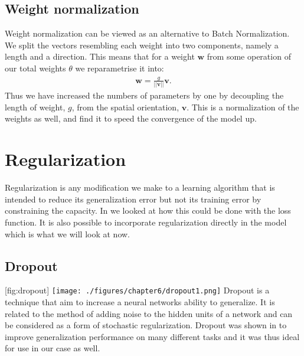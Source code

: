 \subsection{Weight normalization}
Weight normalization\cite{salimansWeightNormalizationSimple2016} can be viewed as an alternative to Batch Normalization. We split the vectors resembling each weight into two components, namely a length and a direction. This means that for a weight $\textbf{w}$ from some operation of our total weights $\theta$ we reparametrise it into:
\begin{align}
	\textbf{w} = \frac{g}{||\textbf{v}||} \textbf{v}.
\end{align}
Thus we have increased the numbers of parameters by one by decoupling the length of weight, $g$, from the spatial orientation, $\textbf{v}$. 
This is a normalization of the weights as well, and \cite{salimansWeightNormalizationSimple2016} find it to speed the convergence of the model up.
\section{Regularization}
\label{sec:reg_model}
Regularization is any modiﬁcation we make to a
learning algorithm that is intended to reduce its generalization error but not its
training error by constraining the capacity.
In  we looked at how this could be done with the loss function.
It is also possible to incorporate regularization directly in the model which is what we will look at now.
\subsection{Dropout}
[fig:dropout]
{\texttt{[image: ./figures/chapter6/dropout1.png]}}
Dropout \cite{hintonImprovingNeuralNetworks2012} is a technique that aim to increase a neural networks ability to generalize. It is related to the method of adding noise to the hidden units of a network and can be considered as a form of stochastic regularization. Dropout was shown in \cite{srivastavaDropoutSimpleWay2014} to improve generalization performance on many different tasks and it was thus ideal for use in our case as well.


